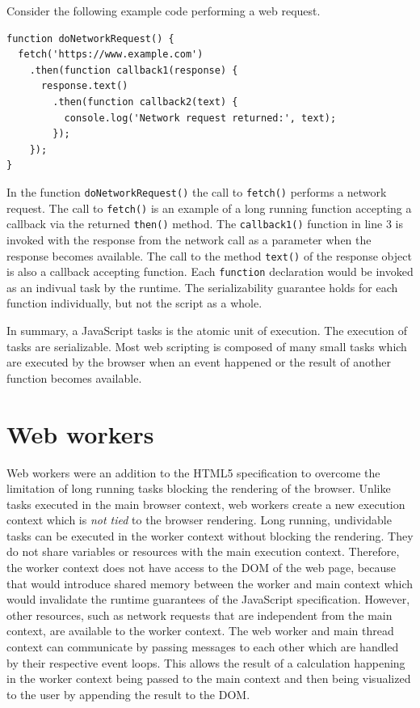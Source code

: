 \documentclass[
	ruledheaders=section,%
	class=report,%
	thesis={type=bachelor},%
	accentcolor=9c,%
	custommargins=true,%
	marginpar=false,%
	parskip=half-,%
	fontsize=11pt,%
]{tudapub}
\begin{document}
  Consider the following example code performing a web request.
\begin{lstlisting}
function doNetworkRequest() {
  fetch('https://www.example.com')
    .then(function callback1(response) {
      response.text()
        .then(function callback2(text) {
          console.log('Network request returned:', text);
        });
    });
}
\end{lstlisting}
  In the function \texttt{doNetworkRequest()} the call to \texttt{fetch()} performs a network request. The call to \texttt{fetch()} is an example of a long running function accepting a callback via the returned \texttt{then()} method. The \texttt{callback1()} function in line 3 is invoked with the response from the network call as a parameter when the response becomes available. The call to the method \texttt{text()} of the response object is also a callback accepting function. Each \texttt{function} declaration would be invoked as an indivual task by the runtime. The serializability guarantee holds for each function individually, but not the script as a whole.

  In summary, a JavaScript tasks is the atomic unit of execution. The execution of tasks are serializable. Most web scripting is composed of many small tasks which are executed by the browser when an event happened or the result of another function becomes available.
  
  \section{Web workers}
  \label{sec:web-workers}

  Web workers were an addition to the HTML5 specification to overcome the limitation of long running tasks blocking the rendering of the browser. Unlike tasks executed in the main browser context, web workers create a new execution context which is \textit{not tied} to the browser rendering. Long running, undividable tasks can be executed in the worker context without blocking the rendering. They do not share variables or resources with the main execution context. Therefore, the worker context does not have access to the DOM of the web page, because that would introduce shared memory between the worker and main context which would invalidate the runtime guarantees of the JavaScript specification. However, other resources, such as network requests that are independent from the main context, are available to the worker context. The web worker and main thread context can communicate by passing messages to each other which are handled by their respective event loops. This allows the result of a calculation happening in the worker context being passed to the main context and then being visualized to the user by appending the result to the DOM.
\end{document}
